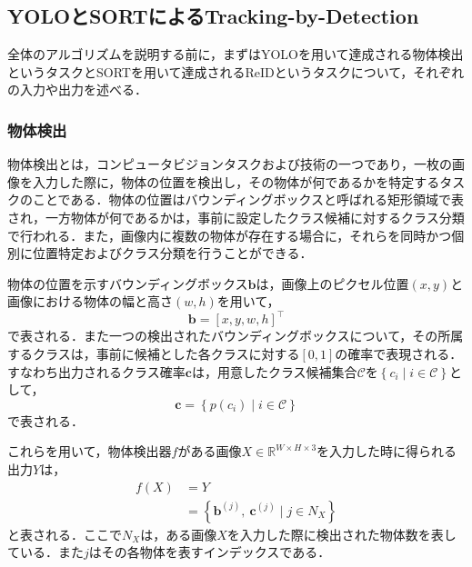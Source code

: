     \subsection{YOLOとSORTによるTracking-by-Detection}
    \label{subsec:yolo_and_sort}
    
    全体のアルゴリズムを説明する前に，まずはYOLOを用いて達成される物体検出というタスクとSORTを用いて達成されるReIDというタスクについて，それぞれの入力や出力を述べる．

        \subsubsection{物体検出}
        物体検出とは，コンピュータビジョンタスクおよび技術の一つであり，一枚の画像を入力した際に，物体の位置を検出し，その物体が何であるかを特定するタスクのことである．物体の位置はバウンディングボックスと呼ばれる矩形領域で表され，一方物体が何であるかは，事前に設定したクラス候補に対するクラス分類で行われる．また，画像内に複数の物体が存在する場合に，それらを同時かつ個別に位置特定およびクラス分類を行うことができる．

        物体の位置を示すバウンディングボックス$\bm{b}$は，画像上のピクセル位置$(x, y)$と画像における物体の幅と高さ$(w,h)$を用いて，
        \begin{equation}
            \label{eq:bounding_box}
            \bm{b} = \left[x, y, w, h\right]^{\top}
        \end{equation}
        で表される．また一つの検出されたバウンディングボックスについて，その所属するクラスは，事前に候補とした各クラスに対する$[0, 1]$の確率で表現される．すなわち出力されるクラス確率$\bm{c}$は，用意したクラス候補集合$\mathcal{C}$を$\left\{c_i \mid i \in \mathcal{C}\right\}$として，
        \begin{equation}
            \label{eq:class_probability}
            \bm{c} = \left\{p(c_i) \mid i \in \mathcal{C}\right\}
        \end{equation}
        で表される．

        これらを用いて，物体検出器$f$がある画像$X \in \mathbb{R}^{W \times H \times 3}$を入力した時に得られる出力$Y$は，
        \begin{equation}
            \label{eq:object_detection}
            \begin{aligned}
                f(X) &= Y
                \\ &= \left\{\bm{b}^{(j)}, ~\bm{c}^{(j)} \mid j \in N_X\right\}
            \end{aligned}
        \end{equation}
        と表される．ここで$N_X$は，ある画像$X$を入力した際に検出された物体数を表している．また$j$はその各物体を表すインデックスである．

